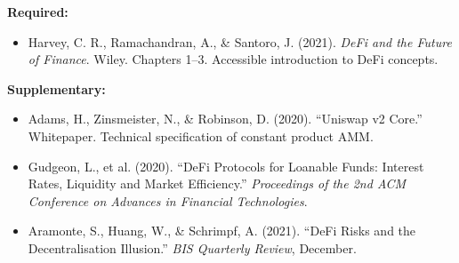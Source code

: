 \documentclass[11pt,a4paper]{article}
\begin{document}
\textbf{Required:}
\begin{itemize}
    \item Harvey, C. R., Ramachandran, A., \& Santoro, J. (2021). \textit{DeFi and the Future of Finance}. Wiley. Chapters 1--3. Accessible introduction to DeFi concepts.
\end{itemize}

\textbf{Supplementary:}
\begin{itemize}
    \item Adams, H., Zinsmeister, N., \& Robinson, D. (2020). ``Uniswap v2 Core.'' Whitepaper. Technical specification of constant product AMM.
    \item Gudgeon, L., et al. (2020). ``DeFi Protocols for Loanable Funds: Interest Rates, Liquidity and Market Efficiency.'' \textit{Proceedings of the 2nd ACM Conference on Advances in Financial Technologies}.
    \item Aramonte, S., Huang, W., \& Schrimpf, A. (2021). ``DeFi Risks and the Decentralisation Illusion.'' \textit{BIS Quarterly Review}, December.
\end{itemize}

\end{document}
